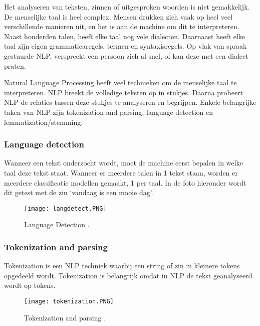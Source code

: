 Het analyseren van teksten, zinnen of uitgesproken woorden is niet gemakkelijk. De menselijke taal is heel complex. Mensen drukken zich vaak op heel veel verschillende manieren uit, en het is aan de machine om dit te interpreteren. Naast honderden talen, heeft elke taal nog vele dialecten. Daarnaast heeft elke taal zijn eigen grammaticaregels, termen en syntaxisregels.
Op vlak van spraak gestuurde NLP, verspreekt een persoon zich al snel, of kan deze met een dialect praten. \autocite{sas2020}

Natural Language Processing heeft veel technieken om de menselijke taal te interpreteren. NLP breekt de volledige teksten op in stukjes. Daarna probeert NLP de relaties tussen deze stukjes te analyseren en begrijpen. Enkele belangrijke taken van NLP zijn tokenization and parsing, language detection en lemmatization/stemming. \autocite{sas2020}

\subsubsection{Language detection}
\label{sec:Languagedetection}

Wanneer een tekst onderzocht wordt, moet de machine eerst bepalen in welke taal deze tekst staat. Wanneer er meerdere talen in 1 tekst staan, worden er meerdere classificatie modellen gemaakt, 1 per taal. In de foto hieronder wordt dit getest met de zin ‘vandaag is een mooie dag’. 

\begin{figure}[!htbp]
    \texttt{[image: langdetect.PNG]}
    \caption{\label{languagedetection}Language Detection \autocite{sas2020}.}
\end{figure}
\FloatBarrier

\subsubsection{Tokenization and parsing}
\label{sec:Tokenization}

Tokenization is een NLP techniek waarbij een string of zin in kleinere tokens opgedeeld wordt. Tokenization is belangrijk omdat in NLP de tekst geanalyseerd wordt op tokens. 

\begin{figure}[!htbp]
    \texttt{[image: tokenization.PNG]}
    \caption{\label{tokenization}Tokenization and parsing \autocite{sas2020}.}
\end{figure}
\FloatBarrier

